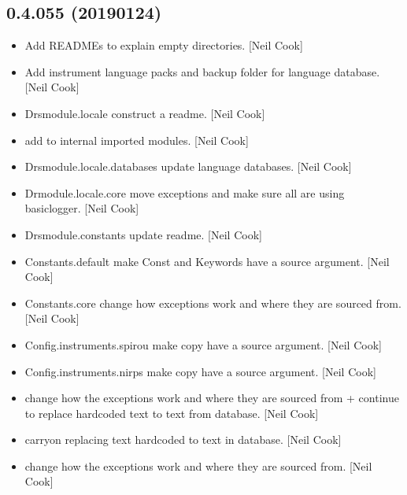 \documentclass[a4paper,10pt,english]{report}
\begin{document}
\subsection{0.4.055 (2019\sphinxhyphen{}01\sphinxhyphen{}24)}
\label{\detokenize{misc/changelog:id228}}\begin{itemize}
\item {} 
Add READMEs to explain empty directories. {[}Neil Cook{]}

\item {} 
Add instrument language packs and backup folder for language database.
{[}Neil Cook{]}

\item {} 
Drsmodule.locale \sphinxhyphen{} construct a readme. {[}Neil Cook{]}

\item {} 
 \sphinxhyphen{} add  to internal imported
modules. {[}Neil Cook{]}

\item {} 
Drsmodule.locale.databases \sphinxhyphen{} update language databases. {[}Neil Cook{]}

\item {} 
Drmodule.locale.core \sphinxhyphen{} move exceptions and make sure all are using
basiclogger. {[}Neil Cook{]}

\item {} 
Drsmodule.constants \sphinxhyphen{} update readme. {[}Neil Cook{]}

\item {} 
Constants.default \sphinxhyphen{} make Const and Keywords have a source argument.
{[}Neil Cook{]}

\item {} 
Constants.core \sphinxhyphen{} change how exceptions work and where they are sourced
from. {[}Neil Cook{]}

\item {} 
Config.instruments.spirou \sphinxhyphen{} make copy have a source argument. {[}Neil
Cook{]}

\item {} 
Config.instruments.nirps \sphinxhyphen{} make copy have a source argument. {[}Neil
Cook{]}

\item {} 
 \sphinxhyphen{} change how the exceptions work and where they are
sourced from + continue to replace hard\sphinxhyphen{}coded text to text from
database. {[}Neil Cook{]}

\item {} 
 \sphinxhyphen{} carryon replacing text hard\sphinxhyphen{}coded to text in database.
{[}Neil Cook{]}

\item {} 
 \sphinxhyphen{} change how the exceptions work and where they are sourced
from. {[}Neil Cook{]}

\end{itemize}
\end{document}
